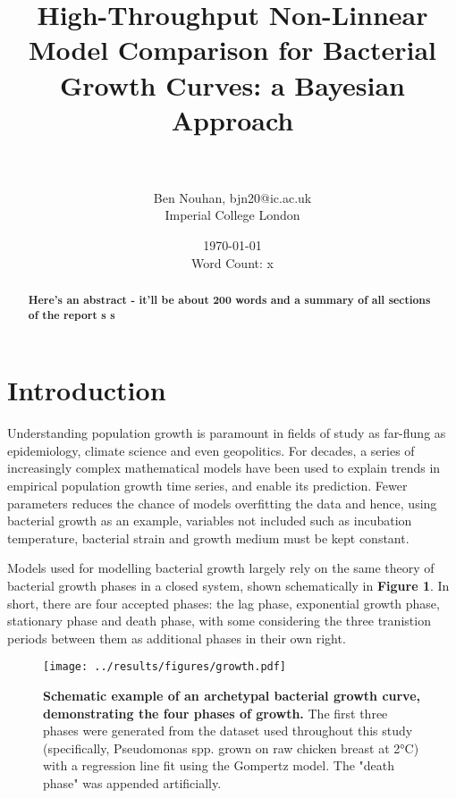\documentclass[11pt]{article}
\title{High-Throughput Non-Linnear Model Comparison for Bacterial Growth Curves: a Bayesian Approach}
\author{\\ \\ Ben Nouhan, bjn20@ic.ac.uk \\ Imperial College London \\}
\date{\today \\ Word Count: x}
\begin{document}
\maketitle
\thispagestyle{empty}

\vspace{30mm}
\onehalfspacing
\renewcommand{\abstractname}{\vspace{-\baselineskip}} %

\begin{abstract}
    \linenumbers
    \noindent
    \textbf{Here's an abstract - it'll be about 200 words and a summary of all sections of the report s s
    }
\end{abstract}
\vspace{10mm}


\newpage
\tableofcontents
\thispagestyle{empty}

\newpage
\linenumbers
\setcounter{page}{1}
\section{Introduction}%


Understanding population growth is paramount in fields of study as far-flung as epidemiology, climate science and even geopolitics.\parencite{Ozgul2010,Peleg1997} For decades, a series of increasingly complex mathematical models have been used to explain trends in empirical population growth time series, and enable its prediction.\parencite{Kingsland1982,Grijspeerdt1999,Tjørve2017} Fewer parameters reduces the chance of models overfitting the data and hence, using bacterial growth as an example, variables not included such as incubation temperature, bacterial strain and growth medium must be kept constant.

Models used for modelling bacterial growth largely rely on the same theory of bacterial growth phases in a closed system, shown schematically in \textbf{Figure 1}. In short, there are four accepted phases: the lag phase, exponential growth phase, stationary phase and death phase, with some considering the three tranistion periods between them as additional phases in their own right.\parencite{Buchanan1918}

\vspace{5mm}
\begin{figure}[htb]
    \centering
    \texttt{[image: ../results/figures/growth.pdf]}
    \caption{\textbf{Schematic example of an archetypal bacterial growth curve, demonstrating the four phases of growth.} The first three phases were generated from the dataset used throughout this study (specifically, Pseudomonas spp. grown on raw chicken breast at 2°C) with a regression line fit using the Gompertz model. The "death phase" was appended artificially.}
\end{figure}
\vspace{5mm}
\end{document}
